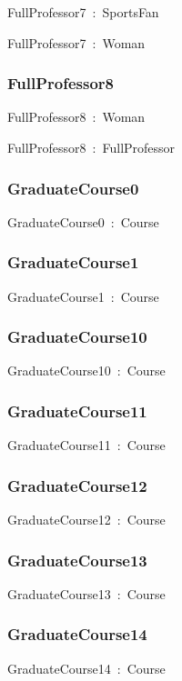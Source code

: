 \documentclass{article}
\begin{document}
FullProfessor7~:~SportsFan

FullProfessor7~:~Woman

\subsubsection*{FullProfessor8}

FullProfessor8~:~Woman

FullProfessor8~:~FullProfessor

\subsubsection*{GraduateCourse0}

GraduateCourse0~:~Course

\subsubsection*{GraduateCourse1}

GraduateCourse1~:~Course

\subsubsection*{GraduateCourse10}

GraduateCourse10~:~Course

\subsubsection*{GraduateCourse11}

GraduateCourse11~:~Course

\subsubsection*{GraduateCourse12}

GraduateCourse12~:~Course

\subsubsection*{GraduateCourse13}

GraduateCourse13~:~Course

\subsubsection*{GraduateCourse14}

GraduateCourse14~:~Course
\end{document}

